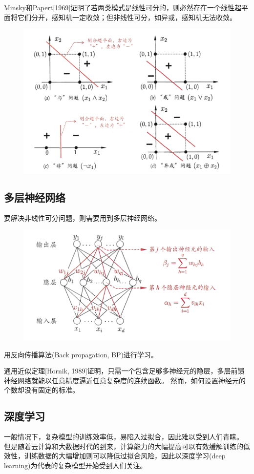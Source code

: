 Minsky和Papert[1969]证明了若两类模式是线性可分的，则必然存在一个线性超平面将它们分开，感知机一定收敛；但非线性可分，如异或，感知机无法收敛。
\begin{figure}[H]
\centering
\includegraphics[width=0.7\linewidth]{fig/linear-separable.png}
\end{figure}

\subsection{多层神经网络}
要解决非线性可分问题，则需要用到多层神经网络。
\begin{figure}[H]
\centering
\includegraphics[width=0.6\linewidth]{fig/BP.png}
\end{figure}

用反向传播算法(Back propagation, BP)进行学习。

通用近似定理[Hornik, 1989]证明，只需一个包含足够多神经元的隐层，多层前馈神经网络就能以任意精度逼近任意复杂度的连续函数。
然而，如何设置神经元的个数却没有固定的标准。

\subsection{深度学习}
一般情况下，复杂模型的训练效率低，易陷入过拟合，因此难以受到人们青睐。
但是随着云计算和大数据时代的到来，计算能力的大幅提高可以有效缓解训练的低效性，训练数据的大幅增加则可以降低过拟合风险，因此以深度学习(deep learning)为代表的复杂模型开始受到人们关注。


